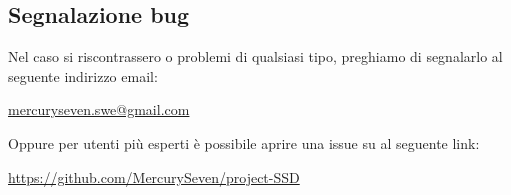 \subsection{Segnalazione bug}

Nel caso si riscontrassero  o problemi di qualsiasi tipo, preghiamo di segnalarlo al seguente indirizzo email:\newline{}
\centerline{\url{mercuryseven.swe@gmail.com}}
Oppure per utenti più esperti è possibile aprire una issue su  al seguente link:\newline{}
\centerline{\url{https://github.com/MercurySeven/project-SSD}}
